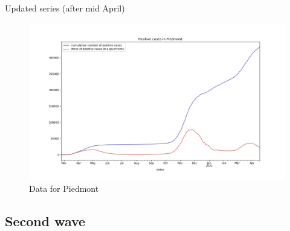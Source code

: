 \documentclass[8pt]{beamer}
\begin{document}
\begin{frame}{Updated series (after mid April)}

\begin{figure}[H]
\center
\includegraphics[scale=0.35]{andamento900midApril.jpg}
\caption{Data for Piedmont} 
\label{dataP}
\end{figure}


\end{frame}




\subsection{Second wave}
\end{document}
